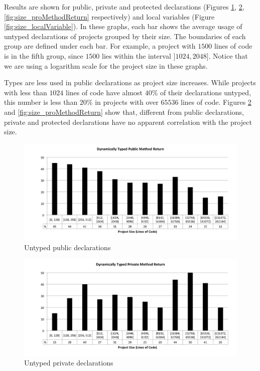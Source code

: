 \documentclass[preprint]{sigplanconf}
\begin{document}
Results are shown for public, private and protected declarations (Figures \ref{fig:size_pubMethodReturn}, \ref{fig:size_priMethodReturn}, \ref{fig:size_proMethodReturn} respectively) and local variables (Figure \ref{fig:size_localVariable}). 
In these graphs, each bar shows the average usage of untyped declarations of projects grouped by their size.
The boundaries of each group are defined under each bar.
For example, a project with $1500$ lines of code is in the fifth group, since $1500$ lies within the interval $]1024, 2048]$.
Notice that we are using a logarithm scale for the project size in these graphs.

Types are less used in public declarations as project size increases.
While projects with less than $1024$ lines of code have almost $40\%$ of their declarations untyped, this number is  less than $20\%$ in projects with over $65536$ lines of code. 
Figures \ref{fig:size_priMethodReturn} and \ref{fig:size_proMethodReturn} show that, different from public declarations, private and protected declarations have no apparent correlation with the project size.

\begin{figure}[ht]
\centering 
\includegraphics[width=1\textwidth]{images/size_pubMethodReturn} 
\caption{Untyped public declarations}
\label{fig:size_pubMethodReturn} 
\end{figure}

\begin{figure}[ht]
\centering 
\includegraphics[width=1\textwidth]{images/size_priMethodReturn} 
\caption{Untyped private declarations}
\label{fig:size_priMethodReturn} 
\end{figure}
\end{document}
